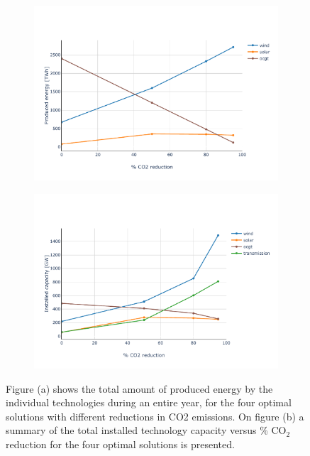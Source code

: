 \begin{figure}[h]\centering
\begin{subfigure}{1\textwidth}
	\includegraphics[width=.9\textwidth,trim={0 0cm 0cm 2.8cm},clip]{./Images/optimal_solutions_summary_production}
	\caption{}
	\label{fig:Optimal_Solutions_produc}
	\end{subfigure}%
\vspace{-10pt}
\begin{subfigure}{1\textwidth}
	\includegraphics[width=1\textwidth,trim={0 0cm 0cm 2.8cm},clip]{./Images/optimal_solutions_summary}
	\caption{}
	\label{fig:Optimal_Solutions_summary}
\end{subfigure}%
\caption{Figure (a) shows the total amount of produced energy by the individual technologies during an entire year, for the four optimal solutions with different reductions in CO2 emissions. On figure (b) a summary of the total installed technology capacity versus \% $\text{CO}_2$ reduction for the four optimal solutions is presented.}
\label{fig:Optimal_Solutions_summary_both}
\end{figure}

